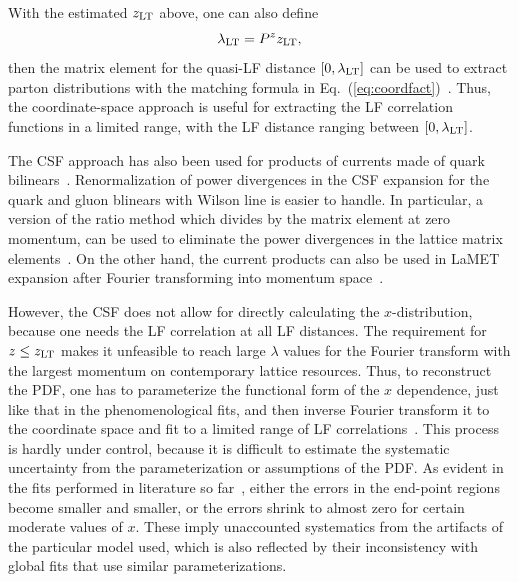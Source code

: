 \documentclass[preprint,12pt]{elsarticle}
\DeclareRobustCommand{\eq}[1]{Eq.~(\ref{eq:#1})}
\begin{document}
With the estimated $z_{\rm LT}$ above, one can also define
\begin{equation}
       \lambda_{\rm LT} = P^zz_{\rm LT},
\end{equation}
then the matrix element for the quasi-LF distance $[0, \lambda_{\rm LT}]$
can be used to extract parton distributions with the matching formula in \eq{coordfact}~\cite{Radyushkin:2017cyf,Ji:2017rah,Izubuchi:2018srq}.
Thus, the coordinate-space approach is useful for extracting the LF correlation functions in a limited range, with the LF distance ranging between $[0,\lambda_{\rm LT}]$.

The CSF approach has also been used for products of currents made of
quark bilinears~\cite{Detmold:2005gg,Braun:2007wv,Bali:2017gfr,Bali:2018spj,Ma:2017pxb,Detmold:2018kwu,Sufian:2019bol,Sufian:2020vzb}.
Renormalization of power divergences in the
CSF expansion for the quark and gluon blinears with Wilson line
is easier to handle. In particular, a version of the ratio method
which  divides by the matrix element at zero momentum, can be used to
eliminate the power divergences in the lattice matrix elements~\cite{Radyushkin:2017cyf,Orginos:2017kos}.
On the other hand, the current products can also be used
in LaMET expansion after Fourier transforming into momentum
space~\cite{Ji:2020ect}.

However, the CSF does not allow for directly calculating the $x$-distribution, because one needs
the LF correlation at all LF distances. The requirement for $z\le z_{\rm LT}$ makes it unfeasible
to reach large $\lambda$ values for the Fourier transform with the largest momentum on contemporary lattice resources. Thus, to reconstruct
the PDF, one has to parameterize the functional form of the $x$ dependence, just like that
in the phenomenological fits, and then
inverse Fourier transform it to the coordinate space and fit to a limited range
of LF correlations~\cite{Orginos:2017kos,Karpie:2018zaz,Joo:2019bzr,Joo:2019jct,Sufian:2019bol,Joo:2020spy,Sufian:2020vzb,Bhat:2020ktg,Gao:2020ito,Fan:2020cpa}.
This process is hardly under control, because it is difficult to estimate
the systematic uncertainty from the parameterization or assumptions of the PDF. As evident in the fits performed in literature so far~\cite{Joo:2019bzr,Joo:2019jct,Sufian:2019bol,Joo:2020spy,Gao:2020ito,Fan:2020cpa}, either the errors in the end-point regions become smaller and smaller, or the errors shrink to almost zero for certain moderate values of $x$. These imply unaccounted systematics from the artifacts of the particular model used, which is also reflected by their inconsistency with global fits that use similar parameterizations.
\end{document}
